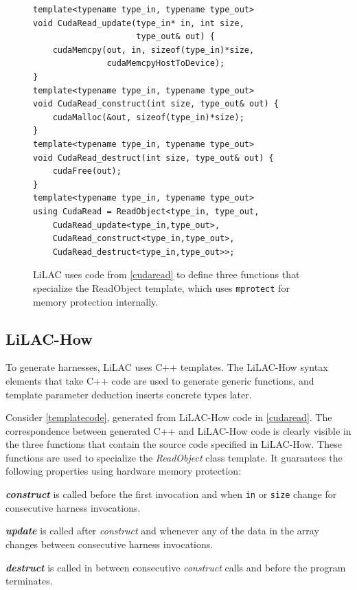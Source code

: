 \begin{figure}[t]
\begin{lstlisting}
template<typename type_in, typename type_out>
void CudaRead_update(type_in* in, int size,
                     type_out& out) {
    cudaMemcpy(out, in, sizeof(type_in)*size,
               cudaMemcpyHostToDevice);
}
template<typename type_in, typename type_out>
void CudaRead_construct(int size, type_out& out) {
    cudaMalloc(&out, sizeof(type_in)*size);
}
template<typename type_in, typename type_out>
void CudaRead_destruct(int size, type_out& out) {
    cudaFree(out);
}
template<typename type_in, typename type_out>
using CudaRead = ReadObject<type_in, type_out,
    CudaRead_update<type_in,type_out>,
    CudaRead_construct<type_in,type_out>,
    CudaRead_destruct<type_in,type_out>>;
\end{lstlisting}
\vspace{-0.5em}
\caption{LiLAC uses code from \autoref{cudaread} to define three functions that
         specialize the ReadObject template, which uses \texttt{mprotect} for
         memory protection internally.}
\label{templatecode}
\end{figure}

\subsection{LiLAC-How}
To generate harnesses, LiLAC uses C++ templates.
The LiLAC-How syntax elements that take C++ code are used to generate
generic functions, and template parameter deduction inserts concrete types later.

Consider \autoref{templatecode}, generated from LiLAC-How code in
\autoref{cudaread}.
The correspondence between generated C++ and LiLAC-How code is clearly visible
in the three functions that contain the source code specified in LiLAC-How.
These functions are used to specialize the {\em ReadObject} class template.
It guarantees the following properties using hardware memory protection:

    \noindent
    {\bf {\em construct}} is called before the first invocation and when
    \texttt{in} or \texttt{size} change for consecutive harness invocations.

    \noindent
    {\bf {\em update}} is called after {\em construct} and whenever any of the
    data in the array changes between consecutive harness invocations.

    \noindent
    {\bf {\em destruct}} is called in between consecutive {\em construct}
    calls and before the program terminates.

